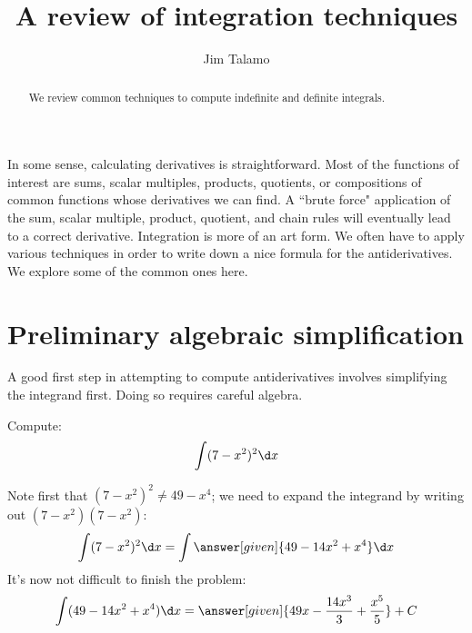 \documentclass[nooutcomes]{ximera}
\author{Jim Talamo}
\title[Dig-In:]{A review of integration techniques}
\begin{document}
\begin{abstract}
  We review common techniques to compute indefinite and definite integrals.
\end{abstract}
\maketitle

In some sense, calculating derivatives is straightforward.  Most of the functions of interest are sums, scalar multiples, products, quotients, or compositions of common functions whose derivatives we can find.  A ``brute force" application of the sum, scalar multiple, product, quotient, and chain rules will eventually lead to a correct derivative.  Integration is more of an art form.  We often have to apply various techniques in order to write down a nice formula for the antiderivatives. We explore some of the common ones here.

\section{Preliminary algebraic simplification}


A good first step in attempting to compute antiderivatives involves simplifying the integrand first.  Doing so requires careful algebra.
\begin{example}
  Compute:
  \[
  \int (7-x^2)^2 \d x
  \]
  \begin{explanation}
   Note first that $(7-x^2)^2 \neq 49-x^4$; we need to expand the integrand by writing out $(7-x^2)(7-x^2)$:
    \[
    \int (7-x^2)^2 \d x  = \int \answer[given]{49 - 14x^2 + x^4} \d x
    \]
    It's now not difficult to finish the problem:
    \[
    \int (49 - 14x^2 + x^4) \d x = \answer[given]{49x - \frac{14 x^3}{3} + \frac{x^5}{5}} + C
    \]
  \end{explanation}
\end{example}


%
%
%
\end{document}
